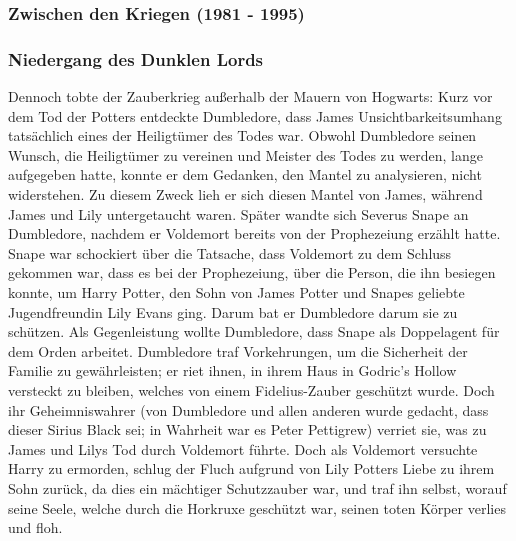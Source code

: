 \documentclass[a4paper, 10pt]{article}
\begin{document}
\subsubsection*{\large Zwischen den Kriegen (1981 - 1995)}
\subsubsection*{Niedergang des Dunklen Lords}
Dennoch tobte der Zauberkrieg außerhalb der Mauern von Hogwarts: Kurz vor dem Tod der Potters entdeckte Dumbledore, dass James Unsichtbarkeitsumhang tatsächlich eines der Heiligtümer des Todes war. Obwohl Dumbledore seinen Wunsch, die Heiligtümer zu vereinen und Meister des Todes zu werden, lange aufgegeben hatte, konnte er dem Gedanken, den Mantel zu analysieren, nicht widerstehen. Zu diesem Zweck lieh er sich diesen Mantel von James, während James und Lily untergetaucht waren. Später wandte sich Severus Snape an Dumbledore, nachdem er Voldemort bereits von der Prophezeiung erzählt hatte. Snape war schockiert über die Tatsache, dass Voldemort zu dem Schluss gekommen war, dass es bei der Prophezeiung, über die Person, die ihn besiegen konnte, um Harry Potter, den Sohn von James Potter und Snapes geliebte Jugendfreundin Lily Evans ging. Darum bat er Dumbledore darum sie zu schützen. Als Gegenleistung wollte Dumbledore, dass Snape als Doppelagent für dem Orden arbeitet.
\vspace{10pt}
\newline
{}  
Dumbledore traf Vorkehrungen, um die Sicherheit der Familie zu gewährleisten; er riet ihnen, in ihrem Haus in Godric's Hollow versteckt zu bleiben, welches von einem Fidelius-Zauber geschützt wurde. Doch ihr Geheimniswahrer (von Dumbledore und allen anderen wurde gedacht, dass dieser Sirius Black sei; in Wahrheit war es Peter Pettigrew) verriet sie, was zu James und Lilys Tod durch Voldemort führte. Doch als Voldemort versuchte Harry zu ermorden, schlug der Fluch aufgrund von Lily Potters Liebe zu ihrem Sohn zurück, da dies ein mächtiger Schutzzauber war, und traf ihn selbst, worauf seine Seele, welche durch die Horkruxe geschützt war, seinen toten Körper verlies und floh.
\vspace{10pt}
\newline
{}  
\end{document}
